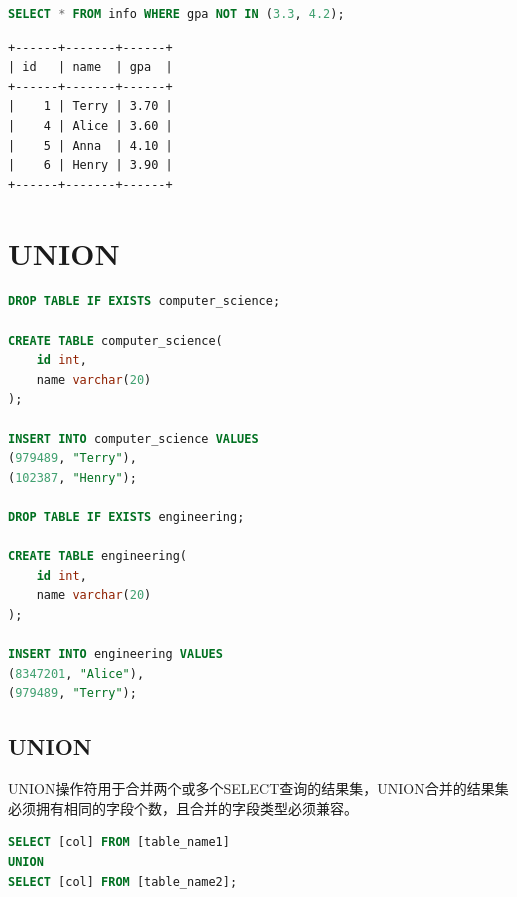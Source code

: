 \documentclass[12pt, openany, oneside]{book}
\begin{document}
\begin{lstlisting}[language=SQL]
SELECT * FROM info WHERE gpa NOT IN (3.3, 4.2);
\end{lstlisting}

\begin{tcolorbox}
	\begin{verbatim}
+------+-------+------+
| id   | name  | gpa  |
+------+-------+------+
|    1 | Terry | 3.70 |
|    4 | Alice | 3.60 |
|    5 | Anna  | 4.10 |
|    6 | Henry | 3.90 |
+------+-------+------+
\end{verbatim}
\end{tcolorbox}

\newpage

\chapter{UNION}

\vspace{0.5cm}


\begin{lstlisting}[language=SQL]
DROP TABLE IF EXISTS computer_science;

CREATE TABLE computer_science(
	id int,
	name varchar(20)
);

INSERT INTO computer_science VALUES
(979489, "Terry"),
(102387, "Henry");

DROP TABLE IF EXISTS engineering;

CREATE TABLE engineering(
	id int,
	name varchar(20)
);

INSERT INTO engineering VALUES
(8347201, "Alice"),
(979489, "Terry");
\end{lstlisting}

\vspace{0.5cm}

\section{UNION}

UNION操作符用于合并两个或多个SELECT查询的结果集，UNION合并的结果集必须拥有相同的字段个数，且合并的字段类型必须兼容。

\vspace{-0.5cm}

\begin{lstlisting}[language=SQL]
SELECT [col] FROM [table_name1]
UNION
SELECT [col] FROM [table_name2];
\end{lstlisting}
\end{document}
